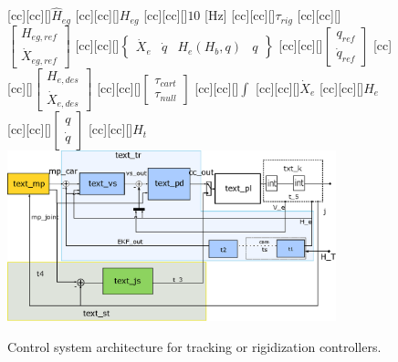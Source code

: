 \begin{figure}
[cc][cc][\FontFigS]{\small{$\hat{H}_{eg}$}}
[cc][cc][\FontFigS]{\small{$H_{eg}$}}
[cc][cc][\FontFigS]{\small{$10$ [Hz]}}
[cc][cc][\FontFigS]{\small{$\tau_{rig}$}}
[cc][cc][\FontFigS]{\small{$\begin{bmatrix}H_{eg,ref}\\ \dot{X}_{eg,ref}\end{bmatrix}$}}
[cc][cc][\FontFigS]{\small{$\begin{Bmatrix}\dot{X}_{e} & \dot{q} & H_{e}(H_b, q) & q\end{Bmatrix}$}}
[cc][cc][\FontFigS]{\small{$\begin{bmatrix}q_{ref}\\ \dot{q}_{ref}\end{bmatrix}$}}
[cc][cc][\FontFigS]{\small{$\begin{bmatrix}H_{e,des}\\ \dot{X}_{e,des}\end{bmatrix}$}}
[cc][cc][\FontFigS]{\small{$\begin{bmatrix}\tau_{cart}\\ \tau_{null}\end{bmatrix}$}}
[cc][cc][\FontFigS]{$\int$}
[cc][cc][\FontFigS]{\small{$\dot{X}_e$}}
[cc][cc][\FontFigS]{\small{$H_e$}}
[cc][cc][\FontFigS]{\small{$\begin{bmatrix}q\\ \dot{q}\end{bmatrix}$}}
[cc][cc][\FontFigS]{\small{$H_t$}}
\centering\includegraphics[angle=0,width=0.85\textwidth]{./figures/BlockDia11}
\caption{Control system architecture for tracking or rigidization controllers.}
\label{fig:blockdiagram}
\end{figure}
%
